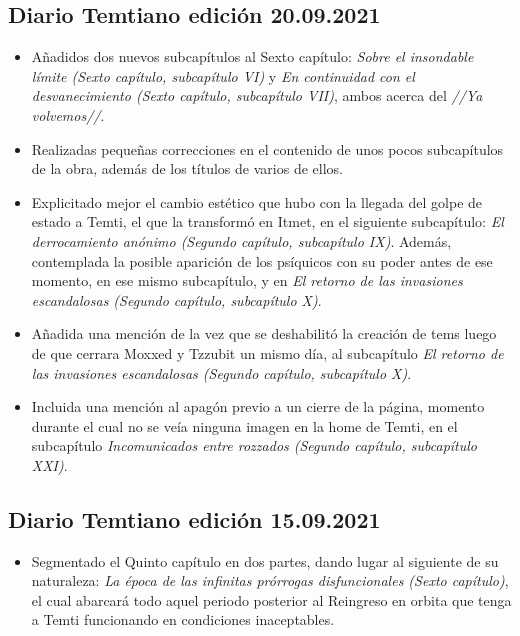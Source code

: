 \documentclass[
  spanish,
]{book}
\providecommand{\tightlist}{%
  \setlength{\itemsep}{0pt}\setlength{\parskip}{0pt}}
\begin{document}
\hypertarget{diario-temtiano-ediciuxf3n-20.09.2021}{%
\subsection*{Diario Temtiano edición 20.09.2021}\label{diario-temtiano-ediciuxf3n-20.09.2021}}

\begin{itemize}
\item
  Añadidos dos nuevos subcapítulos al Sexto capítulo: \emph{Sobre el insondable límite (Sexto capítulo, subcapítulo VI)} y \emph{En continuidad con el desvanecimiento (Sexto capítulo, subcapítulo VII)}, ambos acerca del \emph{//Ya volvemos//}.
\item
  Realizadas pequeñas correcciones en el contenido de unos pocos subcapítulos de la obra, además de los títulos de varios de ellos.
\item
  Explicitado mejor el cambio estético que hubo con la llegada del golpe de estado a Temti, el que la transformó en Itmet, en el siguiente subcapítulo: \emph{El derrocamiento anónimo (Segundo capítulo, subcapítulo IX)}. Además, contemplada la posible aparición de los psíquicos con su poder antes de ese momento, en ese mismo subcapítulo, y en \emph{El retorno de las invasiones escandalosas (Segundo capítulo, subcapítulo X)}.
\item
  Añadida una mención de la vez que se deshabilitó la creación de tems luego de que cerrara Moxxed y Tzzubit un mismo día, al subcapítulo \emph{El retorno de las invasiones escandalosas (Segundo capítulo, subcapítulo X)}.
\item
  Incluida una mención al apagón previo a un cierre de la página, momento durante el cual no se veía ninguna imagen en la home de Temti, en el subcapítulo \emph{Incomunicados entre rozzados (Segundo capítulo, subcapítulo XXI)}.
\end{itemize}

\hypertarget{diario-temtiano-ediciuxf3n-15.09.2021}{%
\subsection*{Diario Temtiano edición 15.09.2021}\label{diario-temtiano-ediciuxf3n-15.09.2021}}

\begin{itemize}
\tightlist
\item
  Segmentado el Quinto capítulo en dos partes, dando lugar al siguiente de su naturaleza: \emph{La época de las infinitas prórrogas disfuncionales (Sexto capítulo)}, el cual abarcará todo aquel periodo posterior al Reingreso en orbita que tenga a Temti funcionando en condiciones inaceptables.
\end{itemize}
\end{document}
